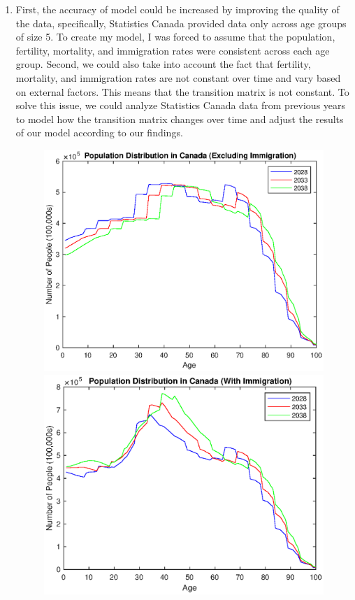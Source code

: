 \documentclass[10pt]{article}
\begin{document}
\begin{enumerate}[leftmargin=\labelsep]
    \item First, the accuracy of model could be increased by improving the quality of the data, specifically, Statistics Canada provided data only across age groups of size 5. To create my model, I was forced to assume that the population, fertility, mortality, and immigration rates were consistent across each age group. Second, we could also take into account the fact that fertility, mortality, and immigration rates are not constant over time and vary based on external factors. This means that the transition matrix is not constant. To solve this issue, we could analyze Statistics Canada data from previous years to model how the transition matrix changes over time and adjust the results of our model according to our findings.
    
    \begin{figure}[h]
        \begin{minipage}[c]{0.48\linewidth}
        \includegraphics[width=\linewidth]{WithoutImmigration.eps}
        \caption{}
        \end{minipage}
        \hfill
        \begin{minipage}[c]{0.48\linewidth}
        \includegraphics[width=\linewidth]{WithImmigration.eps}

\end{minipage}
\end{figure}
\end{enumerate}
\end{document}
